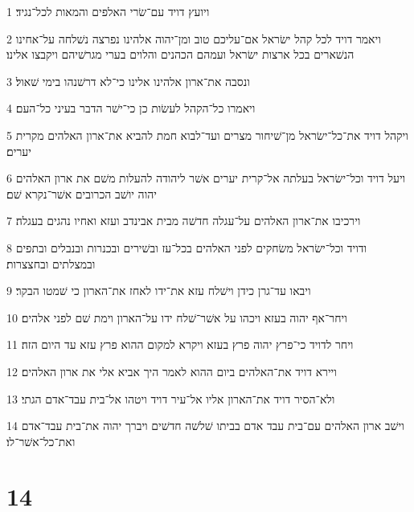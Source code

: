 \par 1 ויועץ דויד עם־שׂרי האלפים והמאות לכל־נגיד׃
\par 2 ויאמר דויד לכל קהל ישׂראל אם־עליכם טוב ומן־יהוה אלהינו נפרצה נשׁלחה על־אחינו הנשׁארים בכל ארצות ישׂראל ועמהם הכהנים והלוים בערי מגרשׁיהם ויקבצו אלינו׃
\par 3 ונסבה את־ארון אלהינו אלינו כי־לא דרשׁנהו בימי שׁאול׃
\par 4 ויאמרו כל־הקהל לעשׂות כן כי־ישׁר הדבר בעיני כל־העם׃
\par 5 ויקהל דויד את־כל־ישׂראל מן־שׁיחור מצרים ועד־לבוא חמת להביא את־ארון האלהים מקרית יערים׃
\par 6 ויעל דויד וכל־ישׂראל בעלתה אל־קרית יערים אשׁר ליהודה להעלות משׁם את ארון האלהים יהוה יושׁב הכרובים אשׁר־נקרא שׁם׃
\par 7 וירכיבו את־ארון האלהים על־עגלה חדשׁה מבית אבינדב ועזא ואחיו נהגים בעגלה׃
\par 8 ודויד וכל־ישׂראל משׂחקים לפני האלהים בכל־עז ובשׁירים ובכנרות ובנבלים ובתפים ובמצלתים ובחצצרות׃
\par 9 ויבאו עד־גרן כידן וישׁלח עזא את־ידו לאחז את־הארון כי שׁמטו הבקר׃
\par 10 ויחר־אף יהוה בעזא ויכהו על אשׁר־שׁלח ידו על־הארון וימת שׁם לפני אלהים׃
\par 11 ויחר לדויד כי־פרץ יהוה פרץ בעזא ויקרא למקום ההוא פרץ עזא עד היום הזה׃
\par 12 ויירא דויד את־האלהים ביום ההוא לאמר היך אביא אלי את ארון האלהים׃
\par 13 ולא־הסיר דויד את־הארון אליו אל־עיר דויד ויטהו אל־בית עבד־אדם הגתי׃
\par 14 וישׁב ארון האלהים עם־בית עבד אדם בביתו שׁלשׁה חדשׁים ויברך יהוה את־בית עבד־אדם ואת־כל־אשׁר־לו׃

\chapter{14}

